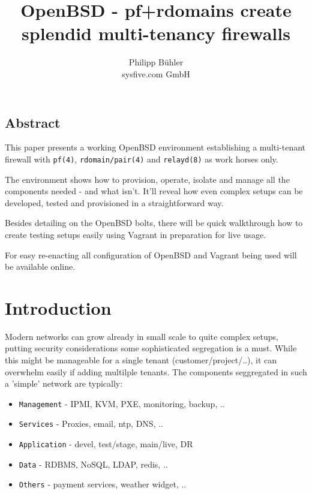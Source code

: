 \documentclass[letterpaper,twocolumn,10pt]{article}
\begin{document}
\date{}

\title{\Large \bf OpenBSD - pf+rdomains create splendid multi-tenancy firewalls}

\author{
{\rm Philipp B\"uhler}\\
sysfive.com GmbH }
\maketitle

\thispagestyle{empty}

\subsection*{Abstract}
This paper presents a working OpenBSD environment establishing a multi-tenant
firewall with {\tt pf(4)}, {\tt rdomain/pair(4)} and {\tt relayd(8)} as work horses only.

The environment shows how to provision, operate, isolate and manage all the
components needed - and what isn't. It'll reveal how even complex setups can
be developed, tested and provisioned in a straightforward way.

Besides detailing on the OpenBSD bolts, there will be quick walkthrough how
to create testing setups easily using Vagrant in preparation for live usage.

For easy re-enacting all configuration of OpenBSD and Vagrant being used will
be available online.

\section{Introduction}
Modern networks can grow already in small scale to quite complex setups, putting security considerations some sophisticated segregation is a must. While this might be manageable for a single tenant (customer/project/..), it can overwhelm easily if adding multilple tenants. 
The components seggregated in such a 'simple' network are typically:
\begin{itemize}
\item {\tt Management} \-- IPMI, KVM, PXE, monitoring, backup, ..
\item {\tt Services} \-- Proxies, email, ntp, DNS, ..
\item {\tt Application} \-- devel, test/stage, main/live, DR
\item {\tt Data} \-- RDBMS, NoSQL, LDAP, redis, ..
\item {\tt Others} \-- payment services, weather widget, ..
\end{itemize}
\end{document}
